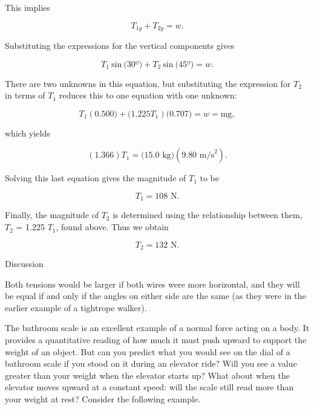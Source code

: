 \documentclass[
]{book}
\newenvironment{tinysection}{}{}
\begin{document}
This implies

\leavevmode\hypertarget{eip-id1339509}{}%
\[{{T_{\text{1}y} + T_{\text{2}y}} = w}.\]

Substituting the expressions for the vertical components gives

\leavevmode\hypertarget{eip-id1925561}{}%
\[{T_{1}\ \text{sin}\ (\text{30º}{) + T_{2}}\ \text{sin}\ (\text{45º}{) = w}}.\]

There are two unknowns in this equation, but substituting the expression
for \(T_{2}{}\) in terms of \(T_{1}{}\) reduces this to one equation with
one unknown:

\leavevmode\hypertarget{eip-id2259246}{}%
\[{T_{1}(0\text{.}\text{500}{) + (}1\text{.}\text{225}T_{1})(0\text{.}\text{707}{{) = w} = \text{mg}}},\]

which yields

\leavevmode\hypertarget{eip-id2556360}{}%
\[{\left( {1\text{.}\text{366}} \right){T_{1} = (}\text{15}\text{.}\text{0\ kg})(9\text{.}\text{80\ m/s}^{2})}.\]

Solving this last equation gives the magnitude of
\(T_{1}{}\)\textbf{} to be

\leavevmode\hypertarget{eip-id1747068}{}%
\[{T_{1} = \text{108\ N}}.\]

Finally, the magnitude of \(T_{2}{}\) is determined using the relationship
between them, \(T_{2}{}\) = 1.225 \(T_{1}{}\), found above. Thus we obtain

\leavevmode\hypertarget{eip-id1744019}{}%
\[{T_{2} = \text{132\ N}}.\]

\begin{tinysection}

{Discussion}

\end{tinysection}

Both tensions would be larger if both wires were more horizontal, and
they will be equal if and only if the angles on either side are the same
(as they were in the earlier example of a tightrope walker).

The bathroom scale is an excellent example of a normal force acting on a
body. It provides a quantitative reading of how much it must push upward
to support the weight of an object. But can you predict what you would
see on the dial of a bathroom scale if you stood on it during an
elevator ride? Will you see a value greater than your weight when the
elevator starts up? What about when the elevator moves upward at a
constant speed: will the scale still read more than your weight at rest?
Consider the following example.
\end{document}
